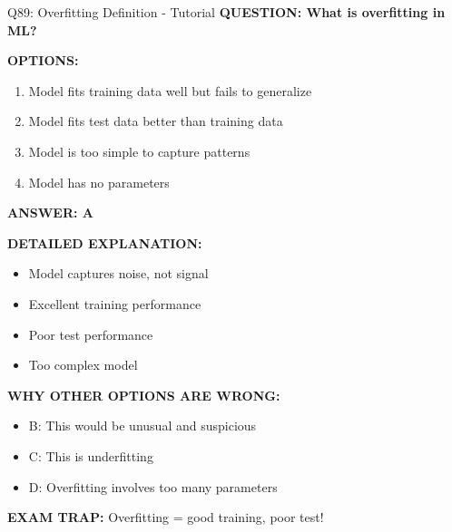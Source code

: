 \documentclass[8pt]{beamer}
\begin{document}
	\begin{frame}{Q89: Overfitting Definition - Tutorial}
		\fontsize{6.5}{7.5}\selectfont
		\textbf{QUESTION: What is overfitting in ML?}
		
		\vspace{0.1cm}
		\textbf{OPTIONS:}
		\begin{enumerate}
			\item Model fits training data well but fails to generalize
			\item Model fits test data better than training data
			\item Model is too simple to capture patterns
			\item Model has no parameters
		\end{enumerate}
		
		\vspace{0.1cm}
		\textcolor{myblue}{\textbf{ANSWER: A}}
		
		\vspace{0.1cm}
		\textbf{DETAILED EXPLANATION:}
		\begin{itemize}
			\item Model captures noise, not signal
			\item Excellent training performance
			\item Poor test performance
			\item Too complex model
		\end{itemize}
		
		\vspace{0.1cm}
		\textcolor{myred}{\textbf{WHY OTHER OPTIONS ARE WRONG:}}
		\begin{itemize}
			\item \textcolor{myred}{B:} This would be unusual and suspicious
			\item \textcolor{myred}{C:} This is underfitting
			\item \textcolor{myred}{D:} Overfitting involves too many parameters
		\end{itemize}
		
		\textcolor{myred}{\textbf{EXAM TRAP:}} Overfitting = \textcolor{myblue}{good training, poor test}!
	\end{frame}
	
\end{document}
